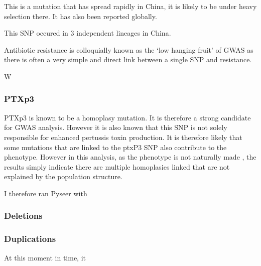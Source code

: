 \documentclass{article}
\begin{document}


This is a mutation that has spread rapidly in China, it is likely to be under heavy selection there. It has also been reported globally.



This SNP occured in 3 independent lineages in China. 

Antibiotic resistance is colloquially known as the `low hanging fruit' of GWAS as there is often a very simple and direct link between a single SNP and resistance.

W


\subsubsection{PTXp3}

PTXp3 is known to be a homoplasy mutation. It is therefore a strong candidate for GWAS analysis. However it is also known that this SNP is not solely responsible for enhanced pertussis toxin production. It is therefore likely that some mutations that are linked to the ptxP3 SNP also contribute to the phenotype. However in this analysis, as the phenotype is not naturally made , the results simply indicate there are multiple homoplasies linked that are not explained by the population structure.

I therefore ran Pyseer with

\subsubsection{Deletions}

\subsubsection{Duplications}


At this moment in time, it 
\subsubsection{}
\end{document}
